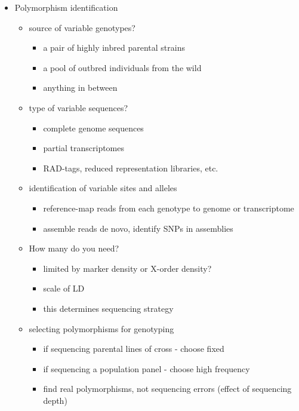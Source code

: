 \documentclass{article}
\begin{document}
\begin{itemize}
\begin{itemize}
        \end{itemize}
        \item Polymorphism identification
        \begin{itemize}
            \item source of variable genotypes?
            \begin{itemize}
                \item a pair of highly inbred parental strains
                \item a pool of outbred individuals from the wild
                \item anything in between
            \end{itemize}
            \item type of variable sequences?
            \begin{itemize}
                \item complete genome sequences
                \item partial transcriptomes
                \item RAD-tags, reduced representation libraries, etc.
            \end{itemize}
            \item identification of variable sites and alleles
            \begin{itemize}
                \item reference-map reads from each genotype to genome or transcriptome
                \item assemble reads de novo, identify SNPs in assemblies
            \end{itemize}
            \item How many do you need?
            \begin{itemize}
                \item limited by marker density or X-order density?
                \item scale of LD
                \item this determines sequencing strategy
            \end{itemize}
            \item selecting polymorphisms for genotyping
            \begin{itemize}
                \item if sequencing parental lines of cross - choose fixed
                \item if sequencing a population panel - choose high frequency
                \item find real polymorphisms, not sequencing errors (effect of sequencing depth)

\end{itemize}
\end{itemize}
\end{itemize}
\end{document}
